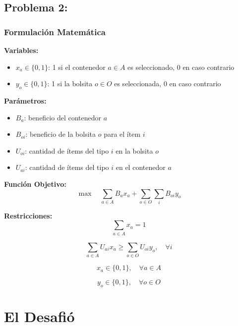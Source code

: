 \documentclass[a4paper,12pt]{article}
\begin{document}
\subsection{Problema 2:}
\label{sec:probl2}

\subsubsection{Formulación Matemática}
\textbf{Variables:}
\begin{itemize}
    \item $x_a \in \{0,1\}$: 1 si el contenedor $a \in A$ es seleccionado, 0 en caso contrario
    \item $y_o \in \{0,1\}$: 1 si la bolsita $o \in O$ es seleccionada, 0 en caso contrario
\end{itemize}

\textbf{Parámetros:}
\begin{itemize}
    \item $B_a$: beneficio del contenedor $a$
    \item $B_{oi}$: beneficio de la bolsita $o$ para el ítem $i$
    \item $U_{oi}$: cantidad de ítems del tipo $i$ en la bolsita $o$
    \item $U_{ai}$: cantidad de ítems del tipo $i$ en el contenedor $a$
\end{itemize}

\textbf{Función Objetivo:}
\begin{equation}
\max \quad \sum_{a \in A} B_a x_a + \sum_{o \in O} \sum_{i} B_{oi} y_o
\end{equation}

\textbf{Restricciones:}
\begin{equation}
\sum_{a \in A} x_a = 1
\end{equation}

\begin{equation}
\sum_{a \in A} U_{ai} x_a \geq \sum_{o \in O} U_{oi} y_o, \quad \forall i
\end{equation}

\begin{equation}
x_a \in \{0,1\}, \quad \forall a \in A
\end{equation}

\begin{equation}
y_o \in \{0,1\}, \quad \forall o \in O
\end{equation}


\section{El Desafió}
\end{document}
